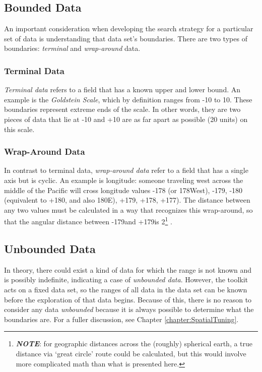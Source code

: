 \subsection{Bounded Data}
An important consideration when developing the search strategy for a particular set of data is understanding that data set's boundaries. There are two types of boundaries: \textit{terminal} and \textit{wrap-around} data.

\subsubsection{Terminal Data}
\textit{Terminal data} refers to a field that has a known upper and lower bound. An example is the \textit{Goldstein Scale}, which by definition ranges from -10  to 10. These boundaries represent extreme ends of the scale. In other words, they are two pieces of data that lie at -10 and +10 are as far apart as possible (20 units) on this scale.

\subsubsection{Wrap-Around Data}
In contrast to terminal data, \textit{wrap-around data} refer to a field that has a single axis but is cyclic. An example is longitude: someone traveling west across the middle of the Pacific will cross longitude values -178 (or 178\degree West), -179, -180 (equivalent to +180, and also 180\degree E), +179, +178, +177). The distance between any two values must be calculated in a way that recognizes this wrap-around, so that the angular distance between -179\degree and +179\degree is 2\degree\footnote{\textbf{\textit{NOTE}}: for geographic distances across the (roughly) spherical earth, a true distance via `great circle' route could be calculated, but this would involve more complicated math than what is presented here.} .

\subsection{Unbounded Data}
In theory, there could exist a kind of data for which the range is not known and is possibly indefinite, indicating a case of \textit{unbounded data}. However, the \gdgas toolkit acts on a fixed data set, so the ranges of all data in the data set can be known before the exploration of that data begins. Because of this, there is no reason to consider any data \textit{unbounded} because it is always possible to determine what the boundaries are. For a fuller discussion, see Chapter \ref{chapter:SpatialTuning}.

